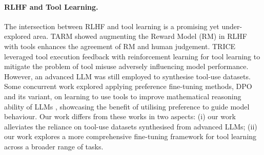 \paragraph{RLHF and Tool Learning.} 
The intersection between RLHF and tool learning is a promising yet under-explored area. TARM \cite{DBLP:conf/iclr/0040CW0T0024} showed augmenting the Reward Model (RM) in RLHF with tools enhances the agreement of RM and human judgement. TRICE \cite{DBLP:conf/naacl/QiaoGLJC024} leveraged tool execution feedback with reinforcement learning for tool learning to mitigate the problem of tool misuse adversely influencing model performance. However, an advanced LLM was still employed to synthesise tool-use datasets. Some concurrent work explored applying preference fine-tuning methods, \eg DPO and its variant, on learning to use tools to improve mathematical reasoning ability of LLMs \citep{xiong2024buildingmathagentsmultiturn, DBLP:conf/acl/WangLL24}, showcasing the benefit of utilising preference to guide model behaviour. Our work differs from these works in two aspects: (i) our work alleviates the reliance on tool-use datasets synthesised from advanced LLMs; (ii) our work explores a more comprehensive fine-tuning framework for tool learning across a broader range of tasks.





